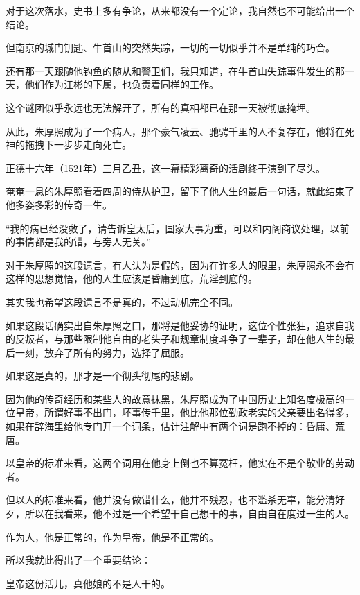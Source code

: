 \begin{multicols}{\theparacolNo}
		对于这次落水，史书上多有争论，从来都没有一个定论，我自然也不可能给出一个结论。

		但南京的城门钥匙、牛首山的突然失踪，一切的一切似乎并不是单纯的巧合。

		还有那一天跟随他钓鱼的随从和警卫们，我只知道，在牛首山失踪事件发生的那一天，他们作为江彬的下属，也负责着同样的工作。

		这个谜团似乎永远也无法解开了，所有的真相都已在那一天被彻底掩埋。

		从此，朱厚照成为了一个病人，那个豪气凌云、驰骋千里的人不复存在，他将在死神的拖拽下一步步走向死亡。

		正德十六年（1521年）三月乙丑，这一幕精彩离奇的活剧终于演到了尽头。

		奄奄一息的朱厚照看着四周的侍从护卫，留下了他人生的最后一句话，就此结束了他多姿多彩的传奇一生。

		“我的病已经没救了，请告诉皇太后，国家大事为重，可以和内阁商议处理，以前的事情都是我的错，与旁人无关。”

		对于朱厚照的这段遗言，有人认为是假的，因为在许多人的眼里，朱厚照永不会有这样的思想觉悟，他的人生应该是昏庸到底，荒淫到底的。

		其实我也希望这段遗言不是真的，不过动机完全不同。

		如果这段话确实出自朱厚照之口，那将是他妥协的证明，这位个性张狂，追求自我的反叛者，与那些限制他自由的老头子和规章制度斗争了一辈子，却在他人生的最后一刻，放弃了所有的努力，选择了屈服。

		如果这是真的，那才是一个彻头彻尾的悲剧。

		因为他的传奇经历和某些人的故意抹黑，朱厚照成为了中国历史上知名度极高的一位皇帝，所谓好事不出门，坏事传千里，他比他那位勤政老实的父亲要出名得多，如果在辞海里给他专门开一个词条，估计注解中有两个词是跑不掉的：昏庸、荒唐。

		以皇帝的标准来看，这两个词用在他身上倒也不算冤枉，他实在不是个敬业的劳动者。

		但以人的标准来看，他并没有做错什么，他并不残忍，也不滥杀无辜，能分清好歹，所以在我看来，他不过是一个希望干自己想干的事，自由自在度过一生的人。

		作为人，他是正常的，作为皇帝，他是不正常的。

		所以我就此得出了一个重要结论：

		皇帝这份活儿，真他娘的不是人干的。
		\ifnum{}
	\end{multicols}
\fi
\newpage
